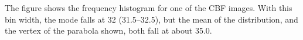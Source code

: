 The figure shows the frequency histogram for one of the CBF images. With this bin width, the mode falls at 32 (31.5--32.5), but the mean of the distribution, and the vertex of the parabola shown, both fall at about 35.0.